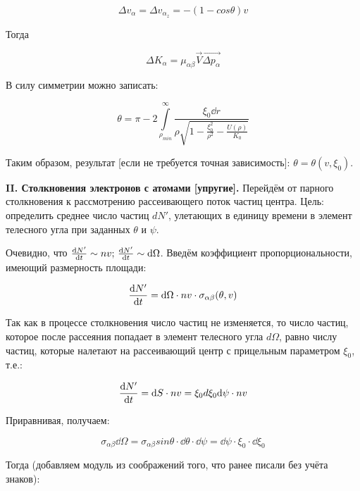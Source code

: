 \documentclass[10pt, a4paper]{article}
\begin{document}
\begin{equation*}
	\Delta v_\alpha = \Delta v_{\alpha_{z}} = -(1-cos\theta)v
\end{equation*}

Тогда

\begin{equation} \label{eq:center_mass_K}
	\Delta K_\alpha = \mu_{\alpha\beta}\vec{V}\overrightarrow{\Delta p_\alpha} 
\end{equation}

В силу симметрии можно записать:

\begin{equation*}
	\theta = \pi - 2 \int\limits_{\rho_{min}}^{\infty}\frac{\xi_0 \dd r}{\rho\sqrt{1-\frac{\xi_0^2}{\rho^2}-\frac{U(\rho)}{K_0}}}
\end{equation*}

Таким образом, результат [если не требуется точная зависимость]: $\theta = \theta(v, \xi_0)$.

{\bfseries \large II. Столкновения электронов с атомами [упругие].} Перейдём от парного столкновения к рассмотрению рассеивающего поток частиц центра. Цель: определить среднее число частиц $dN'$, улетающих в единицу времени в элемент телесного угла при заданных $\theta$ и $\psi$.

Очевидно, что $\dv{N'}{t} \sim nv;\, \dv{N'}{t} \sim \dd \Omega$. Введём коэффициент пропорциональности, имеющий размерность площади:

\begin{equation*}
	\dv{N'}{t} = \dd\Omega\cdot nv \cdot \sigma_{\alpha\beta}(\theta, v)
\end{equation*}

Так как в процессе столкновения число частиц не изменяется, то число частиц, которое после рассеяния попадает в элемент телесного угла $d\Omega$, равно числу частиц, которые налетают на рассеивающий центр с прицельным параметром $\xi_0$, т.е.:

\begin{equation*}
	\dv{N'}{t} = \dd S \cdot nv = \xi_0 d\xi_0 \dd\psi   \cdot nv
\end{equation*}

Приравнивая, получаем:

\begin{equation*}
	\sigma_{\alpha\beta} \dd\Omega = \sigma_{\alpha\beta} sin\theta \cdot \dd\theta \cdot \dd\psi = \dd\psi \cdot \xi_0 \cdot \dd\xi_0
\end{equation*}

Тогда (добавляем модуль из соображений того, что ранее писали без учёта знаков):
\end{document}
